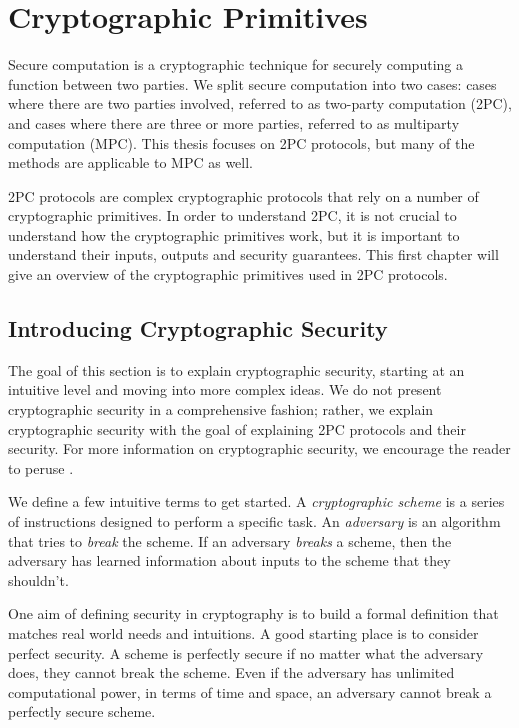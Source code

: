 
\chapter{Cryptographic Primitives}
Secure computation is a cryptographic technique for securely computing a function between two parties.
We split secure computation into two cases: cases where there are two parties involved, referred to as two-party computation (2PC), and cases where there are three or more parties, referred to as multiparty computation (MPC).
This thesis focuses on 2PC protocols, but many of the methods are applicable to MPC as well.

2PC protocols are complex cryptographic protocols that rely on a number of cryptographic primitives.
In order to understand 2PC, it is not crucial to understand how the cryptographic primitives work, but it is important to understand their inputs, outputs and security guarantees. 
This first chapter will give an overview of the cryptographic primitives used in 2PC protocols.

\section{Introducing Cryptographic Security} 
The goal of this section is to explain cryptographic security, starting at an intuitive level and moving into more complex ideas. 
We do not present cryptographic security in a comprehensive fashion; rather, we explain cryptographic security with the goal of explaining 2PC protocols and their security.
For more information on cryptographic security, we encourage the reader to peruse \cite{katzlindelltextbook}. 

We define a few intuitive terms to get started.
A \textit{cryptographic scheme} is a series of instructions designed to perform a specific task. 
An \textit{adversary} is an algorithm that tries to \textit{break} the scheme. 
If an adversary \textit{breaks} a scheme, then the adversary has learned information about inputs to the scheme that they shouldn't. 

One aim of defining security in cryptography is to build a formal definition that matches real world needs and intuitions. 
A good starting place is to consider perfect security. 
A scheme is perfectly secure if no matter what the adversary does, they cannot break the scheme.
Even if the adversary has unlimited computational power, in terms of time and space, an adversary cannot break a perfectly secure scheme. 

